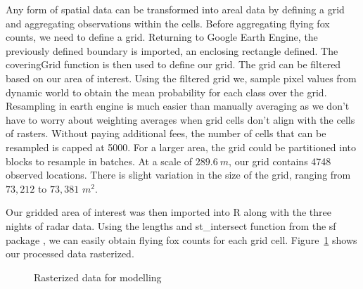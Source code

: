 \documentclass[
  12pt,
  letterpaper,
  DIV=11,
  numbers=noendperiod]{scrartcl}
\begin{document}
Any form of spatial data can be transformed into areal data by defining
a grid and aggregating observations within the cells. Before aggregating
flying fox counts, we need to define a grid. Returning to Google Earth
Engine, the previously defined boundary is imported, an enclosing
rectangle defined. The coveringGrid function is then used to define our
grid. The grid can be filtered based on our area of interest. Using the
filtered grid we, sample pixel values from dynamic world to obtain the
mean probability for each class over the grid. Resampling in earth
engine is much easier than manually averaging as we don't have to worry
about weighting averages when grid cells don't align with the cells of
rasters. Without paying additional fees, the number of cells that can be
resampled is capped at 5000. For a larger area, the grid could be
partitioned into blocks to resample in batches. At a scale of
\(289.6\ m\), our grid contains 4748 observed locations. There is slight
variation in the size of the grid, ranging from \(73,212\) to \(73,381\)
\(m^2\).

Our gridded area of interest was then imported into R along with the
three nights of radar data. Using the lengths and st\_intersect function
from the sf package \citep{sf}, we can easily obtain flying fox counts
for each grid cell. Figure~\ref{fig-proc-dat} shows our processed data
rasterized.

\begin{figure}[H]


\caption{\label{fig-proc-dat}Rasterized data for modelling}

\end{figure}%
\end{document}
